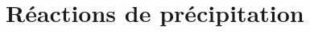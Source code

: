 \documentclass[../main/main.tex]{subfiles}
\begin{document}
\setcounter{chapter}{4}

\chapter{R\'eactions de précipitation}
\end{document}
